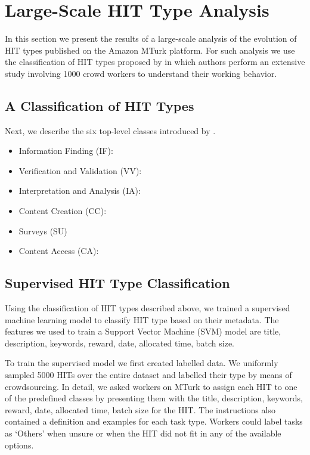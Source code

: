 \section{Large-Scale HIT Type Analysis}\label{sec:type}
In this section we present the results of a large-scale analysis of the evolution of HIT types published on the Amazon MTurk platform.
For such analysis we use the classification of HIT types proposed by \cite{Gadiraju:2014:TMW:2631775.2631819} in which authors perform an extensive study involving 1000 crowd workers to understand their working behavior. 

\subsection{A Classification of HIT Types}
Next, we describe the six top-level classes introduced by \cite{Gadiraju:2014:TMW:2631775.2631819}.

\begin{itemize}

	\item Information Finding (IF): 
	
	\item Verification and Validation (VV):

	\item Interpretation and Analysis (IA):
	
	\item Content Creation (CC):

	\item Surveys (SU)
	
	\item Content Access (CA):

\end{itemize}

\subsection{Supervised HIT Type Classification}
Using the classification of HIT types described above, we trained a supervised machine learning model to classify HIT type based on their metadata. The features we used to train a Support Vector Machine (SVM) model are title, description, keywords, reward, date, allocated time, batch size.

To train the supervised model we first created labelled data. We uniformly sampled 5000 HITs over the entire dataset and labelled their type by means of crowdsourcing. In detail, we asked workers on MTurk to assign each HIT to one of the predefined classes by presenting them with the title, description, keywords, reward, date, allocated time, batch size for the HIT. The instructions also contained a definition and examples for each task type. Workers could label tasks as `Others' when unsure or when the HIT did not fit in any of the available options.


